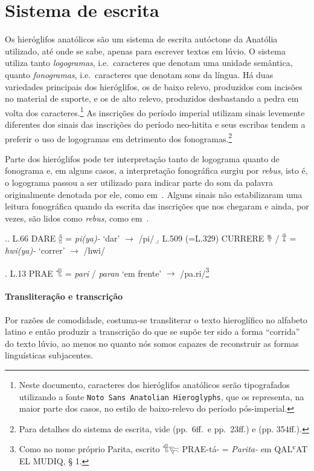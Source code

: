 
\section{Sistema de escrita}

Os hieróglifos anatólicos são um sistema de escrita autóctone da Anatólia
utilizado, até onde se sabe, apenas para escrever textos em lúvio.
O sistema utiliza tanto \emph{logogramas}, i.e.\ caracteres que denotam uma
unidade semântica, quanto \emph{fonogramas}, i.e.\ caracteres que denotam sons da
língua.
Há duas variedades principais dos hieróglifos, os de baixo relevo, produzidos
com incisões no material de suporte, e os de alto relevo, produzidos
desbastando a pedra em volta dos caracteres.\footnote{Neste documento,
	caracteres dos hieróglifos anatólicos serão tipografados utilizando a fonte
		{\tiny\texttt{Noto Sans Anatolian Hieroglyphs}}, que os representa, na
	maior parte dos casos, no estilo de
	baixo-relevo do período pós\hyp{}imperial.}
As inscrições do período imperial utilizam sinais levemente diferentes dos
sinais das inscrições do período neo-hitita e seus escribas tendem a preferir
o uso de logogramas em detrimento dos fonogramas.\footnote{%
	Para detalhes do sistema de escrita, vide
	 (pp.\ 6ff.\ e pp.\ 23ff.) e  (pp. 354ff.).
}


Parte dos hieróglifos pode ter interpretação tanto de logograma quanto de
fonograma e, em alguns casos, a interpretação fonográfica surgiu por
\emph{rebus}, isto é, o logograma passou a ser utilizado para indicar parte do
som da palavra originalmente denotada por ele, como em~\Next.
Alguns sinais não estabilizaram uma leitura fonográfica quando da escrita das
inscrições que nos chegaram e ainda, por vezes, são lidos como \emph{rebus},
como em~\NNext.

\ex.\a. L.66 DARE 𔑈 = \emph{pi{(ya)}-} `dar' $\rightarrow$ /pi/
\b. L.509 (=L.329) CURRERE 𔘰 \slash{} 𔕰 = \emph{hwi{(ya)}-} `correr' $\rightarrow$
/hwi/

\ex. L.13 PRAE 𔐎 = \emph{pari} \slash{} \emph{paran} `em frente' $\rightarrow$
/pa.ri/\footnote{Como no nome próprio Parita, escrito 𔐎𔐞 PRAE-tá- =
	\emph{Parita-} em QAL\textsc{ʿ}AT EL MUDIQ, § 1.}

\paragraph{Transliteração e transcrição}
Por razões de comodidade, costuma-se transliterar o texto hieroglífico no
alfabeto latino e então produzir a transcrição do que se supõe ter sido a
forma ``corrida'' do texto lúvio, ao menos no quanto nós somos capazes de
reconstruir as formas linguísticas subjacentes.

